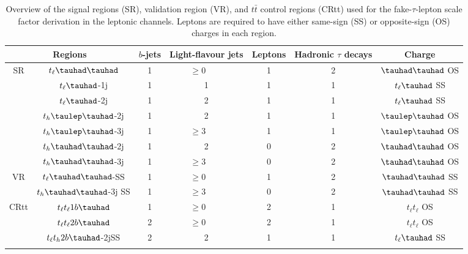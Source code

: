 \begin{table}
\caption{Overview of the signal regions (SR), validation region (VR), and $t\bar{t}$ control regions (CRtt) used for the fake-$\tau$-lepton scale factor derivation in the leptonic channels. Leptons are required to have either same-sign (SS) or opposite-sign (OS) charges in each region.}
\label{tab:srcr}
\begin{center}
\begin{tabular}[h]{c|c|c|c|c|c|c}
\hline \hline
\multicolumn{2}{c|}{Regions} & $b$-jets & Light-flavour jets        & Leptons & Hadronic $\tau$ decays & Charge\\ \hline
\multirow{7}{*}{SR}&$t_{\ell}\thadhad$     & 1     & $\ge0$~~~~                                & 1      & 2             & $\thadhad$ OS\\ \cline{2-7}
&$t_{\ell}\tauhad$-1j  & 1     & 1                                   & 1      & 1                     & $t_{\ell}\tauhad$ SS\\ \cline{2-7}
&$t_{\ell}\tauhad$-2j  & 1     & 2                                        & 1      & 1                     & $t_{\ell}\tauhad$ SS\\ \cline{2-7}
&$t_h\tlhad$-2j   & 1     & 2                           & 1      & 1             & $\tlhad$ OS\\ \cline{2-7}
&$t_h\tlhad$-3j   & 1     & $\ge3$~~~~                      & 1      & 1             & $\tlhad$ OS\\ \cline{2-7}
&$t_h\thadhad$-2j & 1     & 2                            & 0      & 2             & $\thadhad$ OS\\ \cline{2-7}
&$t_h\thadhad$-3j & 1     & $\ge3$~~~~                       & 0      & 2             & $\thadhad$ OS\\ \hline
\multirow{2}{*}{VR}&$t_{\ell}\thadhad$-SS     & 1     & $\ge0$~~~~                                & 1      & 2             & $\thadhad$ SS\\ \cline{2-7}
&$t_h\thadhad$-3j SS & 1     & $\ge3$~~~~                       & 0      & 2             & $\thadhad$ SS\\ \hline
\multirow{6}{*}{CRtt}&$t_{\ell}t_{\ell}1b\tauhad$ & 1     & $\ge0$~~~~                            & 2      & 1                     & $t_{\ell}t_{\ell}$ OS\\ \cline{2-7}
&$t_{\ell}t_{\ell}2b\tauhad$      & 2     & $\ge0$~~~~                            & 2      & 1                     & $t_{\ell}t_{\ell}$ OS\\ \cline{2-7}
&$t_{\ell}t_h2b\tauhad$-2jSS & 2     & 2                             & 1      & 1             & $t_{\ell}\tauhad$ SS\\ \cline{2-7}

\end{tabular}
\end{center}
\end{table}
